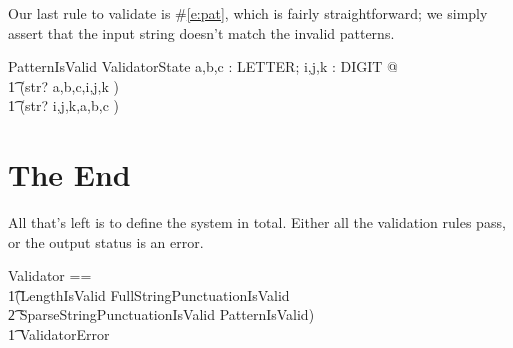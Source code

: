 \documentclass[11pt]{article}
\begin{document}
Our last rule to validate is \#\ref{e:pat}, which is fairly straightforward; we simply assert that
the input string doesn't match the invalid patterns.

\begin{schema}{PatternIsValid}
  ValidatorState
  \where
  \forall a,b,c : LETTER; i,j,k : DIGIT @           \\
  \t1 (str? \neq \langle a,b,c,i,j,k \rangle) \land \\
  \t1 (str? \neq \langle i,j,k,a,b,c \rangle)
\end{schema}

\section{The End}

All that's left is to define the system in total.  Either all the validation rules pass, or the
output status is an error.

\begin{zed}
  Validator ==                                                  \\
  \t1(LengthIsValid \land FullStringPunctuationIsValid \land    \\
  \t2 SparseStringPunctuationIsValid \land PatternIsValid) \lor \\
  \t1 ValidatorError
\end{zed}
\end{document}
